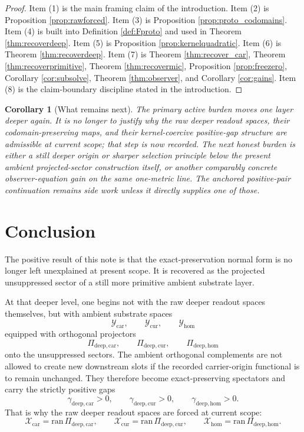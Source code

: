\documentclass[11pt]{article}
\newcommand{\DeepTensorClass}{\mathscr X_{\mathrm{car}}}
\newcommand{\DeepRelabelClass}{\mathscr X_{\mathrm{cur}}}
\newcommand{\DeepFreeClass}{\mathscr X_{\mathrm{hom}}}
\newcommand{\ProtoTensorClass}{\mathscr Y_{\mathrm{car}}}
\newcommand{\ProtoRelabelClass}{\mathscr Y_{\mathrm{cur}}}
\newcommand{\ProtoFreeClass}{\mathscr Y_{\mathrm{hom}}}
\newcommand{\ProtoCarProj}{\Pi_{\mathrm{deep,car}}}
\newcommand{\ProtoCurProj}{\Pi_{\mathrm{deep,cur}}}
\newcommand{\ProtoHomProj}{\Pi_{\mathrm{deep,hom}}}
\newcommand{\ProtoCarGap}{\gamma_{\mathrm{deep,car}}}
\newcommand{\ProtoCurGap}{\gamma_{\mathrm{deep,cur}}}
\newcommand{\ProtoHomGap}{\gamma_{\mathrm{deep,hom}}}
\newtheorem{corollary}{Corollary}
\begin{document}
\begin{proof}
Item (1) is the main framing claim of the introduction. Item (2) is Proposition \ref{prop:rawforced}. Item (3) is Proposition \ref{prop:proto_codomains}. Item (4) is built into Definition \ref{def:Fproto} and used in Theorem \ref{thm:recoverdeep}. Item (5) is Proposition \ref{prop:kernelquadratic}. Item (6) is Theorem \ref{thm:recoverdeep}. Item (7) is Theorem \ref{thm:recover_car}, Theorem \ref{thm:recoverprimitive}, Theorem \ref{thm:recovermic}, Proposition \ref{prop:freezero}, Corollary \ref{cor:subsolve}, Theorem \ref{thm:observer}, and Corollary \ref{cor:gains}. Item (8) is the claim-boundary discipline stated in the introduction.
\end{proof}

\begin{corollary}[What remains next]
The primary active burden moves one layer deeper again. It is no longer to justify why the raw deeper readout spaces, their codomain-preserving maps, and their kernel-coercive positive-gap structure are admissible at current scope; that step is now recorded. The next honest burden is either a still deeper origin or sharper selection principle below the present ambient projected-sector construction itself, or another comparably concrete observer-equation gain on the same one-metric line. The anchored positive-pair continuation remains side work unless it directly supplies one of those.
\end{corollary}

\section{Conclusion}

The positive result of this note is that the exact-preservation normal form is no longer left unexplained at present scope. It is recovered as the projected unsuppressed sector of a still more primitive ambient substrate layer.

At that deeper level, one begins not with the raw deeper readout spaces themselves, but with ambient substrate spaces
\[
\ProtoTensorClass,\qquad
\ProtoRelabelClass,\qquad
\ProtoFreeClass
\]
equipped with orthogonal projectors
\[
\ProtoCarProj,\qquad
\ProtoCurProj,\qquad
\ProtoHomProj
\]
onto the unsuppressed sectors. The ambient orthogonal complements are not allowed to create new downstream slots if the recorded carrier-origin functional is to remain unchanged. They therefore become exact-preserving spectators and carry the strictly positive gaps
\[
\ProtoCarGap>0,\qquad
\ProtoCurGap>0,\qquad
\ProtoHomGap>0.
\]
That is why the raw deeper readout spaces are forced at current scope:
\[
\DeepTensorClass=\mathrm{ran}\,\ProtoCarProj,
\qquad
\DeepRelabelClass=\mathrm{ran}\,\ProtoCurProj,
\qquad
\DeepFreeClass=\mathrm{ran}\,\ProtoHomProj.
\]
\end{document}
